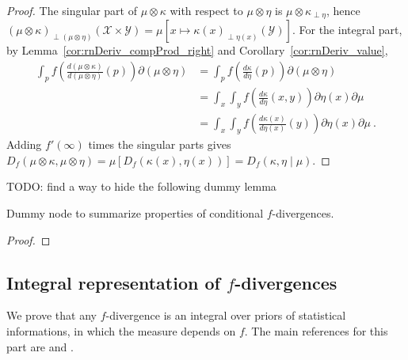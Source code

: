 \begin{proof} \leanok
{}
The singular part of $\mu \otimes \kappa$ with respect to $\mu \otimes \eta$ is $\mu \otimes \kappa_{\perp \eta}$, hence $(\mu \otimes \kappa)_{\perp (\mu \otimes \eta)}(\mathcal X \times \mathcal Y) = \mu\left[x \mapsto \kappa(x)_{\perp \eta(x)}(\mathcal Y)\right]$.
For the integral part, by Lemma~\ref{cor:rnDeriv_compProd_right} and Corollary~\ref{cor:rnDeriv_value},
\begin{align*}
\int_{p} f\left(\frac{d (\mu \otimes \kappa)}{d (\mu \otimes \eta)}(p)\right) \partial(\mu \otimes \eta)
&= \int_{p} f\left(\frac{d \kappa}{d \eta}(p)\right) \partial(\mu \otimes \eta)
\\
&= \int_x \int_y f\left(\frac{d \kappa}{d \eta}(x, y)\right) \partial \eta(x) \partial \mu
\\
&= \int_x \int_y f\left(\frac{d \kappa(x)}{d \eta(x)}(y)\right) \partial \eta(x) \partial \mu
\: .
\end{align*}
Adding $f'(\infty)$ times the singular parts gives $D_f(\mu \otimes \kappa, \mu \otimes \eta) = \mu\left[D_f(\kappa(x), \eta(x))\right] = D_f(\kappa, \eta \mid \mu)$.
\end{proof}




TODO: find a way to hide the following dummy lemma
\begin{lemma}
  \label{lem:condFDiv_properties}
  \leanok
  Dummy node to summarize properties of conditional $f$-divergences.
\end{lemma}

\begin{proof}\leanok
{}
\end{proof}









\subsection{Integral representation of $f$-divergences}

We prove that any $f$-divergence is an integral over priors of statistical informations, in which the measure depends on $f$.
The main references for this part are \cite{liese2006divergences} and \cite{liese2012phi}.


